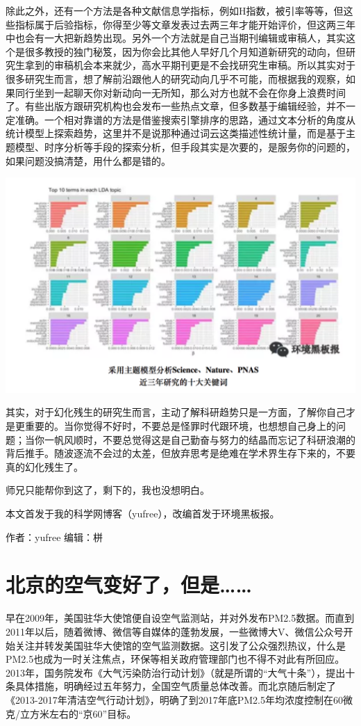 \documentclass[]{book}
\begin{document}
除此之外，还有一个方法是各种文献信息学指标，例如H指数，被引率等等，但这些指标属于后验指标，你得至少等文章发表过去两三年才能开始评价，但这两三年中也会有一大把新趋势出现。另外一个方法就是自己当期刊编辑或审稿人，其实这个是很多教授的独门秘笈，因为你会比其他人早好几个月知道新研究的动向，但研究生拿到的审稿机会本来就少，高水平期刊更是不会找研究生审稿。所以其实对于很多研究生而言，想了解前沿跟他人的研究动向几乎不可能，而根据我的观察，如果同行坐到一起聊天你对新动向一无所知，那么对方也就不会在你身上浪费时间了。有些出版方跟研究机构也会发布一些热点文章，但多数基于编辑经验，并不一定准确。一个相对靠谱的方法是借鉴搜索引擎排序的思路，通过文本分析的角度从统计模型上探索趋势，这里并不是说那种通过词云这类描述性统计量，而是基于主题模型、时序分析等手段的探索分析，但手段其实是次要的，是服务你的问题的，如果问题没搞清楚，用什么都是错的。

\includegraphics[width=6.67in]{images/hhcs6}

其实，对于幻化残生的研究生而言，主动了解科研趋势只是一方面，了解你自己才是更重要的。当你觉得不好时，不要总是怪罪时代跟环境，也想想自己身上的问题；当你一帆风顺时，不要总觉得这是自己勤奋与努力的结晶而忘记了科研浪潮的背后推手。随波逐流不会过的太差，但放弃思考是绝难在学术界生存下来的，不要真的幻化残生了。

师兄只能帮你到这了，剩下的，我也没想明白。

本文首发于我的科学网博客（yufree），改编首发于环境黑板报。

作者：yufree 编辑：栟

\section{北京的空气变好了，但是\ldots{}\ldots{}}

早在2009年，美国驻华大使馆便自设空气监测站，并对外发布PM2.5数据。而直到2011年以后，随着微博、微信等自媒体的蓬勃发展，一些微博大V、微信公众号开始关注并转发美国驻华大使馆的空气监测数据。这引发了公众强烈热议，什么是PM2.5也成为一时关注焦点，环保等相关政府管理部门也不得不对此有所回应。2013年，国务院发布《大气污染防治行动计划》（就是所谓的``大气十条''），提出十条具体措施，明确经过五年努力，全国空气质量总体改善。而北京随后制定了《2013-2017年清洁空气行动计划》，明确了到2017年底PM2.5年均浓度控制在60微克/立方米左右的``京60''目标。
\end{document}
